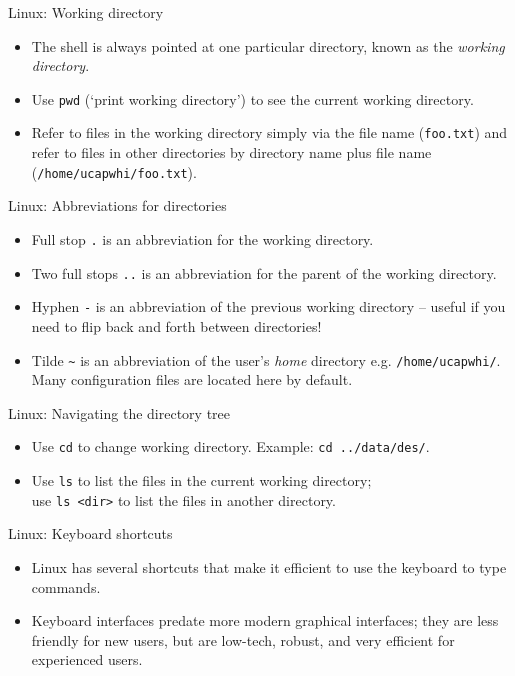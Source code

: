 \documentclass{beamer}
\newcommand{\command}[1]{\colorbox{light-gray}{\texttt{#1}}}
\newcommand{\filename}[1]{\colorbox{light-green}{\texttt{#1}}}
\begin{document}
\begin{frame}{Linux: Working directory}
  \begin{itemize}
    \item{The shell is always pointed at one particular directory, known as the \textit{working directory}.}
    \item{Use \command{pwd} (`print working directory') to see the current working directory.}
    \item{Refer to files in the working directory simply via the file name (\filename{foo.txt}) and refer to files in other directories by directory name plus file name (\filename{/home/ucapwhi/foo.txt}).}
  \end{itemize}
\end{frame}


\begin{frame}{Linux: Abbreviations for directories}
  \begin{itemize}
    \item{Full stop \filename{.} is an abbreviation for the working directory.}
    \item{Two full stops \filename{..} is an abbreviation for the parent of the working directory.}
    \item{Hyphen \filename{-} is an abbreviation of the previous working directory -- useful if you need to flip back and forth between directories!}
    \item{Tilde \filename{\textasciitilde} is an abbreviation of the user's \textit{home} directory e.g. \filename{/home/ucapwhi/}. Many configuration files are located here by default.}
  \end{itemize}
\end{frame}


\begin{frame}{Linux: Navigating the directory tree}
  \begin{itemize}
    \item{Use \command{cd} to change working directory. Example: \command{cd ../data/des/}.}
    \item{Use \command{ls} to list the files in the current working directory; \\use \command{ls <dir>} to list the files in another directory.}
  \end{itemize}
\end{frame}


\begin{frame}{Linux: Keyboard shortcuts}
  \begin{itemize}
    \item{Linux has several shortcuts that make it efficient to use the keyboard to type commands.}
    \item{Keyboard interfaces predate more modern graphical interfaces; they are less friendly for new users, but are low-tech, robust, and very efficient for experienced users.}
  \end{itemize}
\end{frame}
\end{document}
